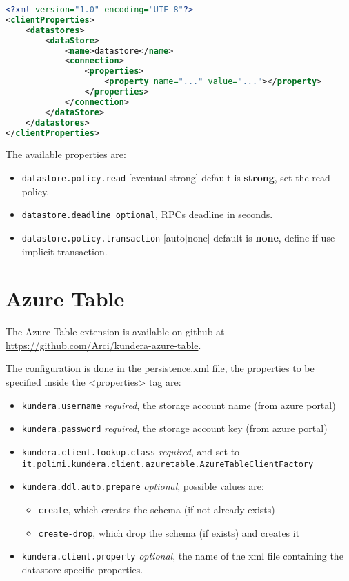 \begin{lstlisting}[language=XML, caption=GAE Datastore - datastore specific configuration]
<?xml version="1.0" encoding="UTF-8"?>
<clientProperties>
    <datastores>
        <dataStore>
            <name>datastore</name>
            <connection>
                <properties>
                    <property name="..." value="..."></property>
                </properties>
            </connection>
        </dataStore>
    </datastores>
</clientProperties>
\end{lstlisting}

\noindent The available properties are:
\begin{itemize}
\item \texttt{datastore.policy.read} [eventual$\vert$strong] default is \textbf{strong}, set the read policy.
\item \texttt{datastore.deadline optional}, RPCs deadline in seconds.
\item \texttt{datastore.policy.transaction} [auto$\vert$none] default is \textbf{none}, define if use implicit transaction.

\end{itemize}

\section{Azure Table}
\label{appendix:table-config}
The Azure Table extension is available on github at \url{https://github.com/Arci/kundera-azure-table}.

\newparagraph The configuration is done in the persistence.xml file, the properties to be specified inside the <properties> tag are:
\begin{itemize}
\item \texttt{kundera.username} \textit{required}, the storage account name (from azure portal)
\item \texttt{kundera.password} \textit{required}, the storage account key (from azure portal)
\item \texttt{kundera.client.lookup.class} \textit{required}, and set to\\\texttt{it.polimi.kundera.client.azuretable.AzureTableClientFactory}
\item \texttt{kundera.ddl.auto.prepare} \textit{optional}, possible values are:
\begin{itemize}
\item \texttt{create}, which creates the schema (if not already exists)
\item \texttt{create-drop}, which drop the schema (if exists) and creates it
\end{itemize}
\item \texttt{kundera.client.property} \textit{optional}, the name of the xml file containing the datastore specific properties.
\end{itemize}

